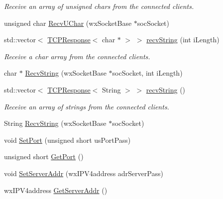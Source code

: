 \begin{DoxyCompactItemize}
\begin{DoxyCompactList}\small\item\em Receive an array of unsigned chars from the connected clients. \end{DoxyCompactList}\item 
unsigned char \hyperlink{class_rad_jav_1_1_networking_1_1wx_widgets_t_c_p_server_a2f37a8bea8dd238002086aa5a89e55da}{Recv\+U\+Char} (wx\+Socket\+Base $\ast$soc\+Socket)
\item 
std\+::vector$<$ \hyperlink{class_rad_jav_1_1_networking_1_1_t_c_p_response}{T\+C\+P\+Response}$<$ char $\ast$ $>$ $>$ \hyperlink{class_rad_jav_1_1_networking_1_1wx_widgets_t_c_p_server_a850a9bae38e211c0ae5bfe573e168b0f}{recv\+String} (int i\+Length)
\begin{DoxyCompactList}\small\item\em Receive a char array from the connected clients. \end{DoxyCompactList}\item 
char $\ast$ \hyperlink{class_rad_jav_1_1_networking_1_1wx_widgets_t_c_p_server_ace20256279e5258cfc0dc818f452e3ce}{Recv\+String} (wx\+Socket\+Base $\ast$soc\+Socket, int i\+Length)
\item 
std\+::vector$<$ \hyperlink{class_rad_jav_1_1_networking_1_1_t_c_p_response}{T\+C\+P\+Response}$<$ String $>$ $>$ \hyperlink{class_rad_jav_1_1_networking_1_1wx_widgets_t_c_p_server_a3688c6c0e0d88f4a30b73b55a5883e22}{recv\+String} ()
\begin{DoxyCompactList}\small\item\em Receive an array of strings from the connected clients. \end{DoxyCompactList}\item 
String \hyperlink{class_rad_jav_1_1_networking_1_1wx_widgets_t_c_p_server_a55a72d55706d41b087fa376c9a045e84}{Recv\+String} (wx\+Socket\+Base $\ast$soc\+Socket)
\item 
void \hyperlink{class_rad_jav_1_1_networking_1_1wx_widgets_t_c_p_server_a8473776ffc087ec0f8d7b8e2d521fffc}{Set\+Port} (unsigned short us\+Port\+Pass)
\item 
unsigned short \hyperlink{class_rad_jav_1_1_networking_1_1wx_widgets_t_c_p_server_a7842feb4e0464fee36279a2cc7f98922}{Get\+Port} ()
\item 
void \hyperlink{class_rad_jav_1_1_networking_1_1wx_widgets_t_c_p_server_a21928809a75fbfed1605f39fda52f334}{Set\+Server\+Addr} (wx\+I\+P\+V4address adr\+Server\+Pass)
\item 
wx\+I\+P\+V4address \hyperlink{class_rad_jav_1_1_networking_1_1wx_widgets_t_c_p_server_a33de2433318656a0e134b53034dcf05f}{Get\+Server\+Addr} ()

\end{DoxyCompactItemize}
